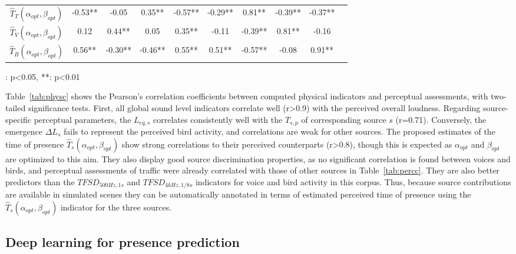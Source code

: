 \documentclass[twocolumn]{article}
\begin{document}
\begin{table}[ht!]
\begin{threeparttable}[t]
\begin{tabular}{ c | c c c c c | c c c c }
	$\hat T_T(\alpha_{opt}, \beta_{opt})$ & -0.53** & -0.05 & 0.35** & -0.57** & -0.29** & 0.81** & -0.39** & -0.37** \\
	$\hat T_V(\alpha_{opt}, \beta_{opt})$ & 0.12 & 0.44** & 0.05 & 0.35** & -0.11 & -0.39** & 0.81** & -0.16 \\
	$\hat T_B(\alpha_{opt}, \beta_{opt})$ & 0.56** & -0.30** & -0.46** & 0.55** & 0.51** & -0.57** & -0.08 & 0.91** \\ \hline
\end{tabular}
\begin{tablenotes}
\item *: p<0.05, **: p<0.01
\end{tablenotes}
\end{threeparttable}
\end{table}

Table~\ref{tab:physc} shows the Pearson's correlation coefficients between computed physical indicators and perceptual assessments, with two-tailed significance tests. First, all global sound level indicators correlate well (r>0.9) with the perceived overall loudness. Regarding source-specific perceptual parameters, the $L_{eq, s}$ correlates consistently well with the $T_{s, p}$ of corresponding source $s$ (r=0.71). Conversely, the emergence $\Delta L_s$ fails to represent the perceived bird activity, and correlations are weak for other sources. The proposed estimates of the time of presence $\hat T_s(\alpha_{opt}, \beta_{opt})$ show strong correlations to their perceived counterparts (r>0.8), though this is expected as $\alpha_{opt}$ and $\beta_{opt}$ are optimized to this aim. They also display good source discrimination properties, as no significant correlation is found between voices and birds, and perceptual assessments of traffic were already correlated with those of other sources in Table~\ref{tab:percc}. They are also better predictors than the $TFSD_{500Hz, 1s}$ and $TFSD_{4kHz, 1/8s}$ indicators for voice and bird activity in this corpus. Thus, because source contributions are available in simulated scenes they can be automatically annotated in terms of estimated perceived time of presence using the $\hat T_s(\alpha_{opt}, \beta_{opt})$ indicator for the three sources.


\subsection{Deep learning for presence prediction}
\label{sec:pred_deep}
\end{document}
